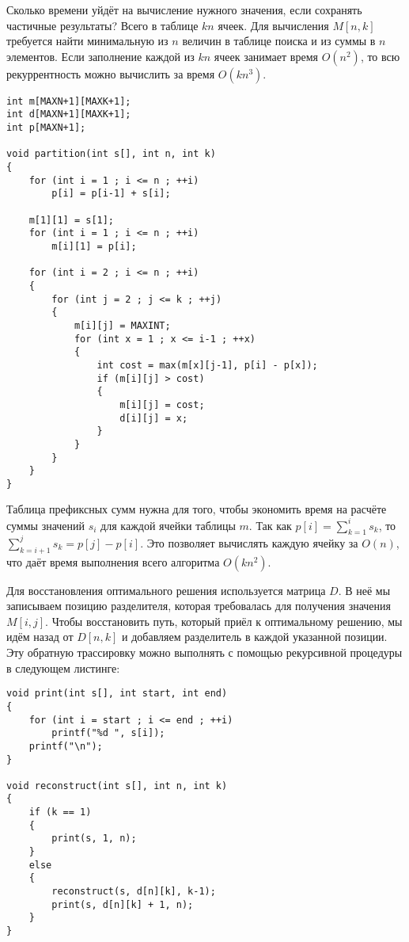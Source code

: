 \documentclass[14pt,openany]{book}
\begin{document}
Сколько времени уйдёт на вычисление нужного значения, если сохранять частичные результаты?
Всего в таблице $kn$ ячеек. Для вычисления $M[n,k]$ требуется найти минимальную из $n$ величин
в таблице поиска и из суммы в $n$ элементов. Если заполнение каждой из $kn$ ячеек занимает время 
$O(n^2)$, то всю рекуррентность можно вычислить за время $O(kn^3)$.

\begin{lstlisting}
int m[MAXN+1][MAXK+1];
int d[MAXN+1][MAXK+1];
int p[MAXN+1];

void partition(int s[], int n, int k)
{
    for (int i = 1 ; i <= n ; ++i)
        p[i] = p[i-1] + s[i];

    m[1][1] = s[1];
    for (int i = 1 ; i <= n ; ++i)
        m[i][1] = p[i];

    for (int i = 2 ; i <= n ; ++i)
    {
        for (int j = 2 ; j <= k ; ++j)
        {
            m[i][j] = MAXINT;
            for (int x = 1 ; x <= i-1 ; ++x)
            {
                int cost = max(m[x][j-1], p[i] - p[x]);
                if (m[i][j] > cost)
                {
                    m[i][j] = cost;
                    d[i][j] = x;
                }
            }
        }
    }
}
\end{lstlisting}

Таблица префиксных сумм нужна для того, чтобы экономить время на расчёте суммы
значений $s_i$ для каждой ячейки таблицы $m$. Так как $p[i] = \sum_{k=1}^{i}s_k$,
то $\sum_{k=i+1}^{j}s_k = p[j] - p[i]$. Это позволяет вычислять каждую ячейку за
$O(n)$, что даёт время выполнения всего алгоритма $O(kn^2)$.

Для восстановления оптимального решения используется матрица $D$. В неё мы записываем
позицию разделителя, которая требовалась для получения значения $M[i,j]$. Чтобы
восстановить путь, который приёл к оптимальному решению, мы идём назад от $D[n,k]$
и добавляем разделитель в каждой указанной позиции. Эту обратную трассировку можно
выполнять с помощью рекурсивной процедуры в следующем листинге:

\begin{lstlisting}
void print(int s[], int start, int end)
{
    for (int i = start ; i <= end ; ++i)
        printf("%d ", s[i]);
    printf("\n");
}

void reconstruct(int s[], int n, int k)
{
    if (k == 1)
    {
        print(s, 1, n);
    }
    else
    {
        reconstruct(s, d[n][k], k-1);
        print(s, d[n][k] + 1, n);
    }
}
\end{lstlisting}
\end{document}
